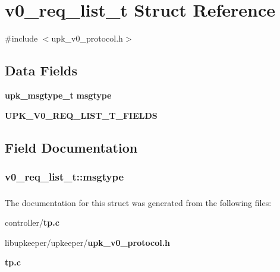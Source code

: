 \section{v0\_\-req\_\-list\_\-t Struct Reference}
\label{structv0__req__list__t}


{\ttfamily \#include $<$upk\_\-v0\_\-protocol.h$>$}

\subsection*{Data Fields}
\begin{DoxyCompactItemize}
\item 
{\bf upk\_\-msgtype\_\-t} {\bf msgtype}
\item 
{\bf UPK\_\-V0\_\-REQ\_\-LIST\_\-T\_\-FIELDS}
\end{DoxyCompactItemize}


\subsection{Field Documentation}
\subsubsection[{msgtype}]{ {\bf v0\_\-req\_\-list\_\-t::msgtype}}\label{structv0__req__list__t_a42e76e757db464c08a9fc61eca922076}
\subsubsection[{UPK\_\-V0\_\-REQ\_\-LIST\_\-T\_\-FIELDS}]{}\label{structv0__req__list__t_acf3eb49327b96aa57bc218564cf5ebd0}


The documentation for this struct was generated from the following files:\begin{DoxyCompactItemize}
\item 
controller/{\bf tp.c}\item 
libupkeeper/upkeeper/{\bf upk\_\-v0\_\-protocol.h}\item 
{\bf tp.c}\end{DoxyCompactItemize}
